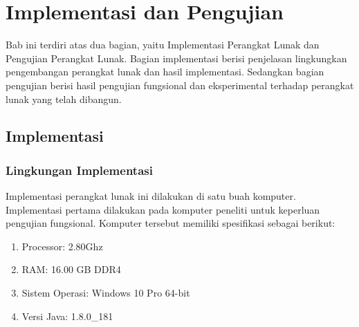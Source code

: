 \chapter{Implementasi dan Pengujian}
\label{chap:implementasiPengujian}

Bab ini terdiri atas dua bagian, yaitu Implementasi Perangkat Lunak dan Pengujian Perangkat Lunak. Bagian implementasi berisi penjelasan lingkungkan pengembangan perangkat lunak dan hasil implementasi. Sedangkan bagian pengujian berisi hasil pengujian fungsional dan eksperimental terhadap perangkat lunak yang telah dibangun.

\section{Implementasi}
\label{sec:implementasi}

\subsection{Lingkungan Implementasi}
		\label{sec:lingkungan_implementasi}
			Implementasi perangkat lunak ini dilakukan di satu buah komputer. Implementasi pertama dilakukan pada komputer peneliti untuk keperluan pengujian fungsional. Komputer tersebut memiliki spesifikasi sebagai berikut:
				\begin{enumerate}
					\item Processor: 2.80Ghz 
					\item RAM: 16.00 GB DDR4	
					\item Sistem Operasi: Windows 10 Pro 64-bit 
					\item Versi Java: 1.8.0\_181
				\end{enumerate}
				
